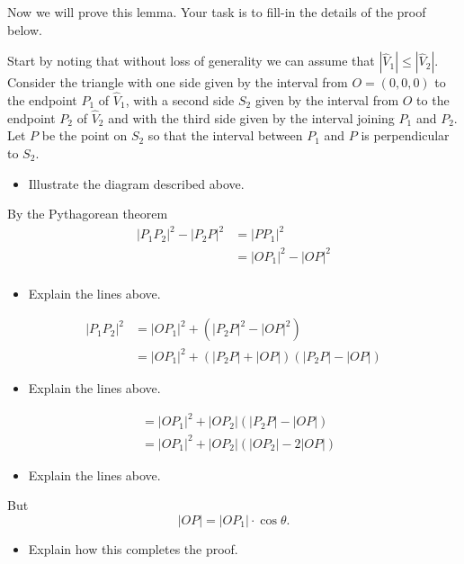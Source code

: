 \documentclass{ximera}
\begin{document}
Now we will prove this lemma. Your task is to fill-in the details of
the proof below.

\begin{problem}
Start by noting that without loss of generality we can assume that $\left\vert \hat{V}%
_{1}\right\vert \leq\left\vert \hat{V}_{2}\right\vert$. Consider the
triangle with one side given by the interval from $O=\left(
0,0,0\right) $ to the endpoint $P_{1}$ of $\hat{V}_{1}$, with a second
side $S_{2}$ given by the interval from $O$ to the endpoint $P_{2}$ of
$\hat{V}_{2}$ and with the third side given by the interval joining
$P_{1}$ and $P_{2}$. Let $P$ be the point on $S_{2}$ so that the
interval between $P_{1}$ and $P$ is perpendicular to $S_{2}$. 
\begin{itemize}
\item Illustrate the diagram described above. 
\end{itemize}

By the Pythagorean theorem%
\begin{align*}
|P_{1}P_{2}|^{2} - |P_{2}P|^{2} &= |PP_{1}|^{2}\\
&= |OP_{1}|^{2} - |OP|^{2}\\
\end{align*}
\begin{itemize}
\item Explain the lines above.
\end{itemize}
\begin{align*}
|P_{1}P_{2}|^{2} &= |OP_{1}|^{2}+\left(|P_{2}P|^{2}-|OP|^{2}\right) \\
&=|OP_{1}|^{2}+\left(|P_{2}P|+|OP|\right)\left(|P_{2}P|-|OP| \right)
\end{align*}
\begin{itemize}
\item Explain the lines above.
\end{itemize}
\begin{align*}
&=|OP_{1}|^{2}+|OP_{2}| \left(|P_{2}P|-|OP|\right)\\
&=|OP_{1}|^{2}+|OP_{2}| \left(|OP_{2}| -2| OP| \right)
\end{align*}
\begin{itemize}
\item Explain the lines above.
\end{itemize}
But%
\[
|OP| =|OP_{1}| \cdot\cos\theta.
\]
\begin{itemize}
\item Explain how this completes the proof.
\end{itemize}
\end{problem}
\end{document}
